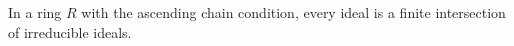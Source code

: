 In a ring $R$ with the ascending chain condition, every ideal is a finite intersection of irreducible ideals.
